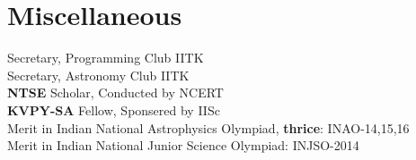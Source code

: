 \documentclass[]{deedy-resume-openfont}
\begin{document}
\begin{minipage}[t]{0.30\textwidth}
\section{Miscellaneous}
\vspace{0.1cm}
Secretary, Programming Club IITK \\
\vspace{0.1cm}
Secretary, Astronomy Club IITK \\
\vspace{0.1cm}
\textbf{NTSE} Scholar, Conducted by NCERT \\
\vspace{0.1cm}
\textbf{KVPY-SA} Fellow, Sponsered by IISc \\
\vspace{0.1cm}
Merit in Indian National Astrophysics Olympiad, \textbf{thrice}: INAO-14,15,16 \\
\vspace{0.1cm}
Merit in Indian National Junior Science Olympiad: INJSO-2014 \\

%
%

\end{minipage} 
\hfill
\end{document}
